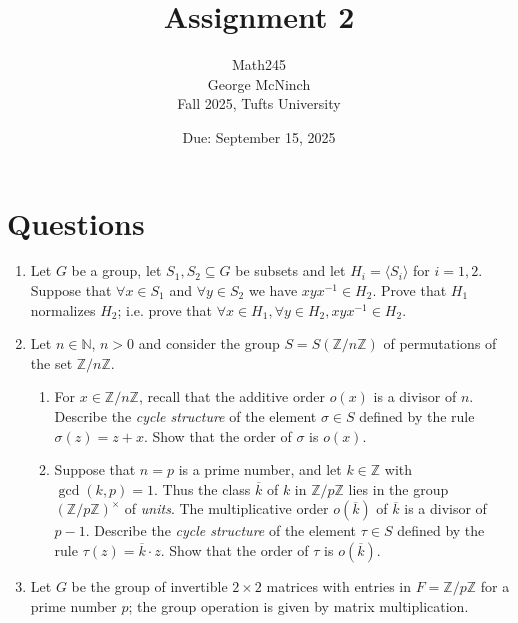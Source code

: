 \documentclass{article}
\title{Assignment 2}
\author{Math245 \\ George McNinch \\ Fall 2025, Tufts University}
\date{Due: September 15, 2025}
\begin{document}
\maketitle

\section*{Questions}

\begin{enumerate}
\item
Let $G$ be a group, let $S_1, S_2 \subseteq G$ be subsets and let $H_i = \langle S_i \rangle$ for $i=1,2$. Suppose that $\forall x \in S_1$ and $\forall y \in S_2$ we have $xyx^{-1} \in H_2$. Prove that $H_1$ normalizes $H_2$; i.e. prove that $\forall x \in H_1, \forall y \in H_2, xyx^{-1} \in H_2$.

\item
Let $n \in \mathbb{N}$, $n > 0$ and consider the group $S = S(\mathbb{Z}/n\mathbb{Z})$ of permutations of the set $\mathbb{Z}/n\mathbb{Z}$.

\begin{enumerate}
    \item For $x \in \mathbb{Z}/n\mathbb{Z}$, recall that the additive order $o(x)$ is a divisor of $n$. Describe the \textit{cycle structure} of the element $\sigma \in S$ defined by the rule $\sigma(z) = z + x$. Show that the order of $\sigma$ is $o(x)$.
    \item Suppose that $n = p$ is a prime number, and let $k \in \mathbb{Z}$ with $\gcd(k,p) = 1$. Thus the class $\overline{k}$ of $k$ in $\mathbb{Z}/p\mathbb{Z}$ lies in the group $(\mathbb{Z}/p\mathbb{Z})^\times$ of \textit{units}. The multiplicative order $o(\overline{k})$ of $\overline{k}$ is a divisor of $p-1$. Describe the \textit{cycle structure} of the element $\tau \in S$ defined by the rule $\tau(z) = \overline{k} \cdot z$. Show that the order of $\tau$ is $o(\overline{k})$.
\end{enumerate}

\item
Let $G$ be the group of invertible $2 \times 2$ matrices with entries in $F = \mathbb{Z}/p\mathbb{Z}$ for a prime number $p$; the group operation is given by matrix multiplication.


\end{enumerate}
\end{document}
